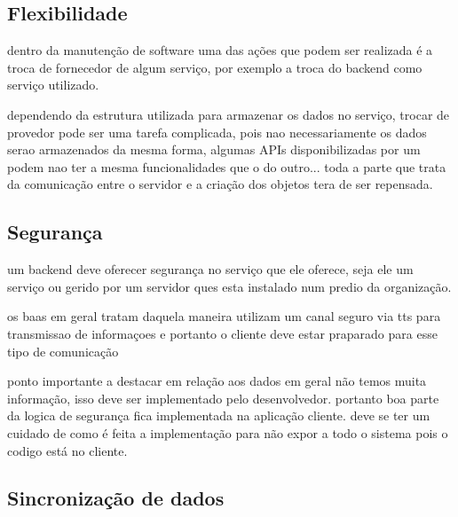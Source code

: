 
	\subsection{Flexibilidade}%
	\label{subsec:flexibility}

	dentro da manutenção de software uma das ações que podem ser realizada é a troca de fornecedor de algum serviço, por exemplo a troca do backend como serviço utilizado.

	dependendo da estrutura utilizada para armazenar os dados no serviço, trocar de provedor pode ser uma tarefa complicada, pois nao necessariamente os dados serao armazenados da mesma forma, algumas APIs disponibilizadas por um podem nao ter a mesma funcionalidades que o do outro... toda a parte que trata da comunicação entre o servidor e a criação dos objetos tera de ser repensada.

	


	\subsection{Segurança}%
	\label{subsec:security}

	um backend deve oferecer segurança no serviço que ele oferece, seja ele um serviço ou gerido por um servidor ques esta instalado num predio da organização.

	os baas em geral tratam daquela maneira
		utilizam um canal seguro via tts para transmissao de informaçoes
		e portanto o cliente deve estar praparado para esse tipo de comunicação

	ponto importante a destacar
	em relação aos dados em geral não temos muita informação, isso deve ser implementado pelo desenvolvedor. portanto boa parte da logica de segurança fica implementada na aplicação cliente. deve se ter um cuidado de como é feita a implementação para não expor a todo o sistema pois o codigo está no cliente.


	\subsection{Sincronização de dados}%
	\label{subsec:data_sync}
	
